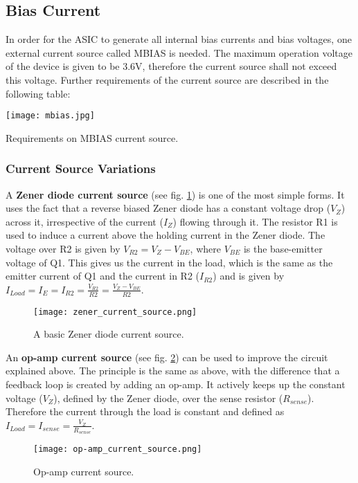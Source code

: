 \subsection{Bias Current}
\label{sec:bias_current}
In order for the ASIC to generate all internal bias currents and bias voltages, one external current source called MBIAS is needed.
The maximum operation voltage of the device is given to be 3.6V, therefore the current source shall not exceed this voltage.
Further requirements of the current source are described in the following table:\cite[p. 64-65]{Meier2016VATA466}
\begin{table}[H]
	\centering
    \texttt{[image: mbias.jpg]}
    \caption[MBIAS Parameters]{Requirements on MBIAS current source.\cite[p. 65, tab. 30]{Meier2016VATA466}}
	\label{tab:mbias}
\end{table}

\subsubsection{Current Source Variations}
\label{sec:current_source}
A \textbf{Zener diode current source} (see fig. \ref{fig:zener_current_source}) is one of the most simple forms.
It uses the fact that a reverse biased Zener diode has a constant voltage drop ($V_Z$) across it, irrespective of the current ($I_Z$) flowing through it.
The resistor R1 is used to induce a current above the holding current in the Zener diode.
The voltage over R2 is given by $V_{R2} = V_Z - V_{BE}$, where $V_{BE}$ is the base-emitter voltage of Q1.
This gives us the current in the load, which is the same as the emitter current of Q1 and the current in R2 ($I_{R2}$) and is given by $I_{Load} = I_E = I_{R2} = \frac{V_{R2}}{R2} = \frac{V_Z-V_{BE}}{R2}$.
\begin{figure}[H]
    \centering
    \texttt{[image: zener\_current\_source.png]}
    \caption[Zener Current Source]{A basic Zener diode current source.\cite{wikipedia2016current}}
    \label{fig:zener_current_source}
\end{figure}

An \textbf{op-amp current source} (see fig. \ref{fig:op-amp_current_source}) can be used to improve the circuit explained above.
The principle is the same as above, with the difference that a feedback loop is created by adding an op-amp.
It actively keeps up the constant voltage ($V_Z$), defined by the Zener diode, over the sense resistor ($R_{sense}$).
Therefore the current through the load is constant and defined as $I_{Load} = I_{sense} = \frac{V_Z}{R_{sense}}$.
\begin{figure}[H]
    \centering
    \texttt{[image: op-amp\_current\_source.png]}
    \caption[Op-amp Current Source]{Op-amp current source.\cite{wikipedia2016current}}
    \label{fig:op-amp_current_source}
\end{figure}


